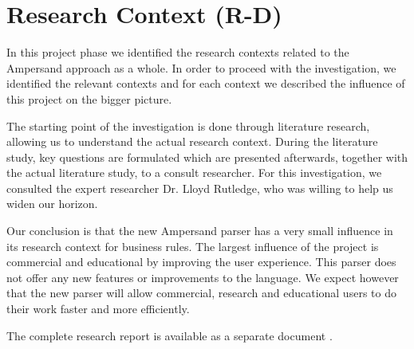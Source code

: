 
\section{Research Context (R-D)}
\label{sec:research-context}

In this project phase we identified the research contexts related to the Ampersand approach as a whole.
In order to proceed with the investigation, we identified the relevant contexts and for each context we described the influence of this project on the bigger picture.

The starting point of the investigation is done through literature research, allowing us to understand the actual research context.
During the literature study, key questions are formulated which are presented afterwards, together with the actual literature study, to a consult researcher.
For this investigation, we consulted the expert researcher Dr. Lloyd Rutledge, who was willing to help us widen our horizon.

Our conclusion is that the new Ampersand parser has a very small influence in its research context for business rules.
The largest influence of the project is commercial and educational by improving the user experience.
This parser does not offer any new features or improvements to the language.
We expect however that the new parser will allow commercial, research and educational users to do their work faster and more efficiently.

The complete research report is available as a separate document .